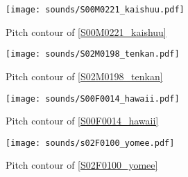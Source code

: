 %
\begin{figure}
	\begin{center}
	\texttt{[image: sounds/S00M0221\_kaishuu.pdf]}
	\caption{Pitch contour of \ref{S00M0221_kaishuu}}
	\label{S00M0221_kaishuuF}
	\end{center}
\end{figure}
\begin{figure}
	\begin{center}
	\texttt{[image: sounds/S02M0198\_tenkan.pdf]}
	\caption{Pitch contour of \ref{S02M0198_tenkan}}
	\label{S02M0198_tenkanF}
	\end{center}
\end{figure}
\begin{figure}
	\begin{center}
	\texttt{[image: sounds/S00F0014\_hawaii.pdf]}
	\caption{Pitch contour of \ref{S00F0014_hawaii}}
	\label{S00F0014_hawaiiF}
	\end{center}
\end{figure}
\begin{figure}
	\begin{center}
	\texttt{[image: sounds/s02F0100\_yomee.pdf]}
	\caption{Pitch contour of \ref{S02F0100_yomee}}
	\label{S02F0100_yomeeF}
	\end{center}
\end{figure}

